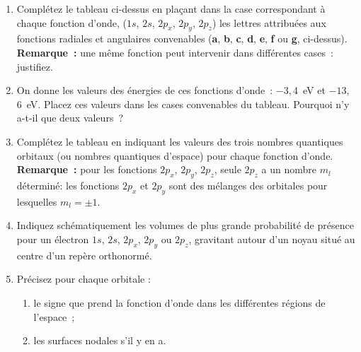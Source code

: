 \begin{enumerate}[\bf 1)]
\item Compl\'etez le tableau ci-dessus en pla\c{c}ant dans la case correspondant \`a chaque fonction d'onde, ($1s$, $2s$, $2p_x$, $2p_y$, $2p_z$) les lettres attribu\'ees aux fonctions radiales et angulaires convenables (\textbf{a}, \textbf{b}, \textbf{c}, \textbf{d}, \textbf{e}, \textbf{f} ou \textbf{g}, ci-dessus).\\

\textbf{Remarque~:} une m\^eme fonction peut intervenir dans diff\'erentes cases~: justifiez.

\item On donne les valeurs des \'energies de ces fonctions d'onde~: $-3,$4~eV et $-13,$6~eV. Placez ces valeurs dans les cases convenables du tableau. Pourquoi n'y a-t-il que deux valeurs~?

\item Compl\'etez le tableau en indiquant les valeurs des trois nombres quantiques orbitaux (ou nombres quantiques d'espace) pour chaque fonction d'onde.\\

\textbf{Remarque~:} pour les fonctions $2p_x$, $2p_y$, $2p_z$, seule $2p_z$ a un nombre $m_l$ déterminé: les fonctions $2p_x$ et $2p_y$ sont des mélanges des orbitales pour lesquelles $m_l=\pm 1$.

\item Indiquez sch\'ematiquement les volumes de plus grande probabilit\'e de pr\'esence pour un \'electron $1s$, $2s$, $2p_x$, $2p_y$ ou $2p_z$, gravitant autour d'un noyau situ\'e au centre d'un rep\`ere orthonorm\'e.
\item Pr\'ecisez pour chaque orbitale :
\begin{enumerate}
\item le signe que prend la fonction d'onde dans les diff\'erentes r\'egions de l'espace~;
\item les surfaces nodales s'il y en a.
\end{enumerate}
\end{enumerate}

